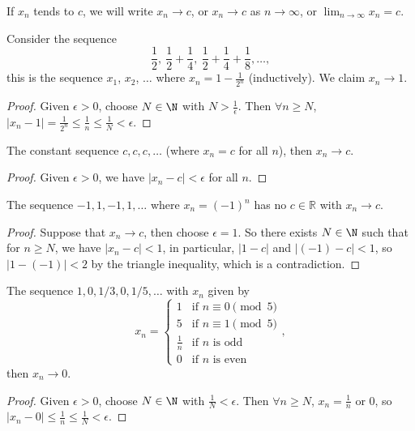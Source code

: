 \documentclass[a4paper]{scrartcl}
\begin{document}
\begin{notation}
	If $x_n$ tends to $c$, we will write $x_n \rightarrow c$, or $x_n \rightarrow c$ as $n \rightarrow \infty$, or $\displaystyle\lim_{n \to \infty} x_n = c$.
\end{notation}

\begin{example}
	Consider the sequence 
	$$\frac{1}{2},\ \frac{1}{2} + \frac{1}{4},\ \frac{1}{2} + \frac{1}{4} + \frac{1}{8}, \dots,$$
	this is the sequence $x_1$, $x_2$, $\dots$ where $x_n = 1 - \frac{1}{2^n}$ (inductively).
	We claim $x_n \rightarrow 1$.
\end{example}
\begin{proof}
	Given $\epsilon > 0$, choose $N \in \N$ with $N > \frac{1}{\epsilon}$. Then $\forall n \geq N$, $|x_n - 1| = \frac{1}{2^n} \leq \frac{1}{n} \leq \frac{1}{N} < \epsilon$.
\end{proof}

\begin{example}
	The constant sequence $c, c, c, \dots$ (where $x_n = c$ for all $n$), then $x_n\rightarrow c$.
\end{example}
\begin{proof}
	Given $\epsilon > 0$, we have $|x_n - c| < \epsilon$ for all $n$.
\end{proof}

\begin{example}
	The sequence $-1, 1, -1, 1, \dots$ where $x_n = (-1)^n$ has no $c \in \mathbb{R}$ with $x_n \rightarrow c$.
\end{example}
\begin{proof}
	Suppose that $x_n \rightarrow c$, then choose $\epsilon = 1$. So there exists $N \in \N$ such that for $n \geq N$, we have $|x_n - c| < 1$, in particular, $|1 - c|$ and $|(-1) - c| < 1$, so $|1 - (-1)| < 2$ by the triangle inequality, which is a contradiction.
\end{proof}

\begin{example}
	The sequence $1, 0, 1/3, 0, 1/5, \dots$ with $x_n$ given by
	$$
	x_n = \begin{cases}
		1 &\mbox{if } n \equiv 0 \pmod{5} \\
	   5 & \mbox{if } n \equiv 1  \pmod{5}\\ 
	   \frac{1}{n} & \mbox{if } n \text{ is odd}\\
	   0 & \mbox{if } n \text{ is even}
	   \end{cases},
	$$
	then $x_n \rightarrow 0$.
\end{example}
\begin{proof}
	Given $\epsilon > 0$, choose $N \in \N$ with $\frac{1}{N} < \epsilon$. Then $\forall n \geq N$, $x_n = \frac{1}{n}$ or 0, so $|x_n - 0| \leq \frac{1}{n} \leq \frac{1}{N} < \epsilon$.
\end{proof}
\end{document}
